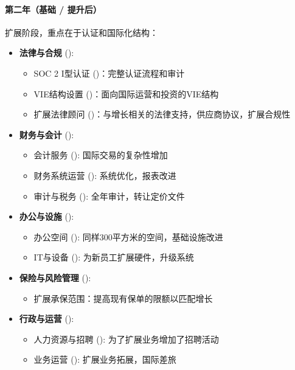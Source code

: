 \documentclass[11pt, a4paper, oneside]{article}
\begin{document}
\paragraph{第二年（基础 / 提升后）}
扩展阶段，重点在于认证和国际化结构：

\begin{itemize}
    \item \textbf{法律与合规} ():
    \begin{itemize}
        \item SOC 2 I型认证 ()：完整认证流程和审计
        \item VIE结构设置 ()：面向国际运营和投资的VIE结构
        \item 扩展法律顾问 ()：与增长相关的法律支持，供应商协议，扩展合规性
    \end{itemize}



\item \textbf{财务与会计} ():
    \begin{itemize}
        \item 会计服务 (): 国际交易的复杂性增加
        \item 财务系统运营 (): 系统优化，报表改进
        \item 审计与税务 (): 全年审计，转让定价文件
    \end{itemize}
    
    \item \textbf{办公与设施} ():
    \begin{itemize}
        \item 办公空间 (): 同样300平方米的空间，基础设施改进
        \item IT与设备 (): 为新员工扩展硬件，升级系统
    \end{itemize}
    
    \item \textbf{保险与风险管理} ():
    \begin{itemize}
        \item 扩展承保范围：提高现有保单的限额以匹配增长
    \end{itemize}
    
    \item \textbf{行政与运营} ():
    \begin{itemize}
        \item 人力资源与招聘 (): 为了扩展业务增加了招聘活动
        \item 业务运营 (): 扩展业务拓展，国际差旅
    \end{itemize}
\end{itemize}
\end{document}

